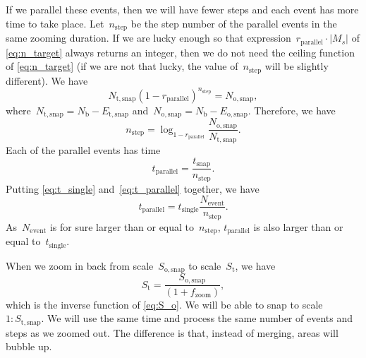 \documentclass[ijgi,article,submit,moreauthors,pdftex]{Definitions/mdpi}
\begin{document}
If we parallel these events, 
then we will have fewer steps and 
each event has more time to take place.
Let~$n_\mathrm{step}$ be the step number of the parallel events 
in the same zooming duration.
If we are lucky enough so that
expression~$r_\mathrm{parallel} \cdot |M_s|$ of \eq\ref{eq:n_target}
always returns an integer, 
then we do not need the ceiling function of \eq\ref{eq:n_target}
(if we are not that lucky, the value of~$n_\mathrm{step}$ will be slightly different).
We have 
\begin{equation*}
N_\mathrm{t,snap} (1-r_\mathrm{parallel})^{n_\mathrm{step}} = N_\mathrm{o,snap},
\end{equation*}
where~$N_\mathrm{t,snap} = N_\mathrm{b}- E_\mathrm{t,snap}$ 
and~$N_\mathrm{o,snap} = N_\mathrm{b}- E_\mathrm{o,snap}$.
Therefore, we have
\begin{equation*}
n_\mathrm{step} = \log_{1-r_\mathrm{parallel}} 
    \frac{N_\mathrm{o,snap}}{N_\mathrm{t,snap}}.
\end{equation*}
Each of the parallel events has time
\begin{equation}
\label{eq:t_parallel}
t_\mathrm{parallel} = \frac{t_\mathrm{snap}}{n_\mathrm{step}}.
\end{equation}
Putting \eqs\ref{eq:t_single} and~\ref{eq:t_parallel} together,
we have
\begin{equation}
\label{eq:t_compare}
t_\mathrm{parallel} = t_\mathrm{single}  \frac{N_\mathrm{event}}{n_\mathrm{step}}.
\end{equation}
As~$N_\mathrm{event}$ is for sure larger than or equal to~$n_\mathrm{step}$,
$t_\mathrm{parallel}$ is also larger than or equal to~$t_\mathrm{single}$.


When we zoom in back from scale~$S_\mathrm{o,snap}$ to scale~$S_\mathrm{t}$, 
we have
\begin{equation}
\label{eq:S_i}
S_\mathrm{t} = \frac{S_\mathrm{o,snap}}{(1 + f_\mathrm{zoom})},
\end{equation}
which is the inverse function of \eq\ref{eq:S_o}.
We will be able to snap to scale~$1:S_\mathrm{t,snap}$.
We will use the same time and process the same number of events and steps as we zoomed out.
The difference is that, instead of merging, areas will bubble up.
\end{document}
